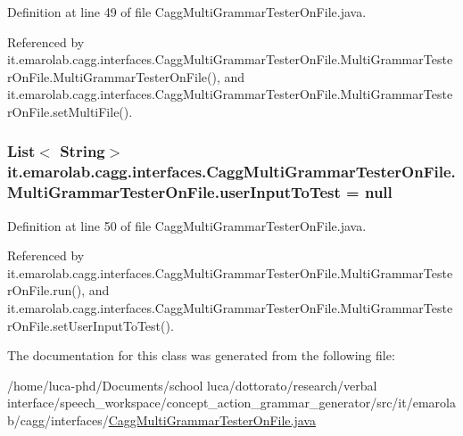 Definition at line 49 of file Cagg\-Multi\-Grammar\-Tester\-On\-File.\-java.



Referenced by it.\-emarolab.\-cagg.\-interfaces.\-Cagg\-Multi\-Grammar\-Tester\-On\-File.\-Multi\-Grammar\-Tester\-On\-File.\-Multi\-Grammar\-Tester\-On\-File(), and it.\-emarolab.\-cagg.\-interfaces.\-Cagg\-Multi\-Grammar\-Tester\-On\-File.\-Multi\-Grammar\-Tester\-On\-File.\-set\-Multi\-File().

\hypertarget{classit_1_1emarolab_1_1cagg_1_1interfaces_1_1CaggMultiGrammarTesterOnFile_1_1MultiGrammarTesterOnFile_a93d89bd3fd1b8f94fa8b3ef7b5dccd09}{
\subsubsection[{user\-Input\-To\-Test}]{\setlength{\rightskip}{0pt plus 5cm}List$<$ String$>$ it.\-emarolab.\-cagg.\-interfaces.\-Cagg\-Multi\-Grammar\-Tester\-On\-File.\-Multi\-Grammar\-Tester\-On\-File.\-user\-Input\-To\-Test = null\hspace{0.3cm}{\ttfamily [private]}}}\label{classit_1_1emarolab_1_1cagg_1_1interfaces_1_1CaggMultiGrammarTesterOnFile_1_1MultiGrammarTesterOnFile_a93d89bd3fd1b8f94fa8b3ef7b5dccd09}


Definition at line 50 of file Cagg\-Multi\-Grammar\-Tester\-On\-File.\-java.



Referenced by it.\-emarolab.\-cagg.\-interfaces.\-Cagg\-Multi\-Grammar\-Tester\-On\-File.\-Multi\-Grammar\-Tester\-On\-File.\-run(), and it.\-emarolab.\-cagg.\-interfaces.\-Cagg\-Multi\-Grammar\-Tester\-On\-File.\-Multi\-Grammar\-Tester\-On\-File.\-set\-User\-Input\-To\-Test().



The documentation for this class was generated from the following file\-:\begin{DoxyCompactItemize}
\item 
/home/luca-\/phd/\-Documents/school luca/dottorato/research/verbal interface/speech\-\_\-workspace/concept\-\_\-action\-\_\-grammar\-\_\-generator/src/it/emarolab/cagg/interfaces/\hyperlink{CaggMultiGrammarTesterOnFile_8java}{Cagg\-Multi\-Grammar\-Tester\-On\-File.\-java}\end{DoxyCompactItemize}
